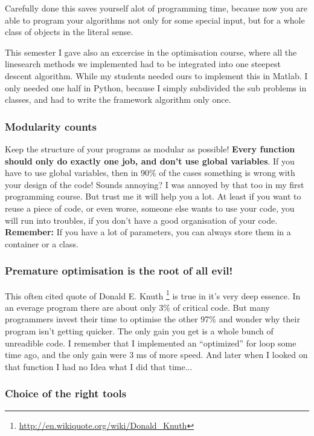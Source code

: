 \documentclass[letterpaper,10pt,english]{manual}
\begin{document}
Carefully done this saves yourself alot of programming time, because now you are able
to program your algorithms not only for some special input, but for a whole class of objects
in the literal sense.

This semester I gave also an excercise in the optimisation course, where
all the linesearch methods we implemented had to be integrated into one steepest descent algorithm.
While my students needed ours to implement this in Matlab. I only needed one half in Python, because
I simply subdivided the sub problems in classes, and had to write the framework algorithm only once.


\subsubsection{Modularity counts}

Keep the structure of your programs as modular as possible!
\textbf{Every function should only do exactly one job, and don't use
global variables}. If you have to use global variables, then in
90\% of the cases something is wrong with your design of the code!
Sounds annoying? I was annoyed by that too in my first programming
course. But trust me it will help you a lot. At least if you want to
reuse a piece of code, or even worse, someone else wants to use your
code, you will run into troubles, if you don't have a good
organisation of your code. \textbf{Remember:}  If you have a lot of
parameters, you can always store them in a container or a class.


\subsubsection{Premature optimisation is the root of all evil!}

This often cited quote of Donald E. Knuth \footnote{
\href{http://en.wikiquote.org/wiki/Donald\_Knuth}{http://en.wikiquote.org/wiki/Donald\_Knuth}
} is true in it's very deep essence. In an everage program
there are about only 3\% of critical code. But many programmers invest their time to optimise the
other 97\% and wonder why their program isn't getting quicker. The only gain you get is a whole bunch
of unreadible code. I remember that I implemented an ``optimized'' for loop some time ago, and the only gain were
3 ms of more speed. And later when I looked on that function I had no Idea what I did that time...


\subsubsection{Choice of the right tools}
\end{document}
